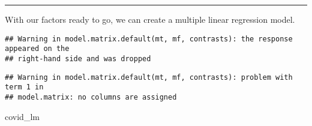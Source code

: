 \documentclass[
]{article}
\newenvironment{Shaded}{\begin{snugshade}}{\end{snugshade}}
\newcommand{\KeywordTok}[1]{\textcolor[rgb]{0.13,0.29,0.53}{\textbf{#1}}}
\newcommand{\NormalTok}[1]{#1}
\newcommand{\OperatorTok}[1]{\textcolor[rgb]{0.81,0.36,0.00}{\textbf{#1}}}
\newcommand{\StringTok}[1]{\textcolor[rgb]{0.31,0.60,0.02}{#1}}
\begin{document}
\begin{center}\rule{0.5\linewidth}{0.5pt}\end{center}

With our factors ready to go, we can create a multiple linear regression
model.

\begin{Shaded}
\end{Shaded}

\begin{verbatim}
## Warning in model.matrix.default(mt, mf, contrasts): the response appeared on the
## right-hand side and was dropped
\end{verbatim}

\begin{verbatim}
## Warning in model.matrix.default(mt, mf, contrasts): problem with term 1 in
## model.matrix: no columns are assigned
\end{verbatim}

\begin{Shaded}
\begin{Highlighting}[]
\NormalTok{covid_lm}
\end{Highlighting}
\end{Shaded}
\end{document}
